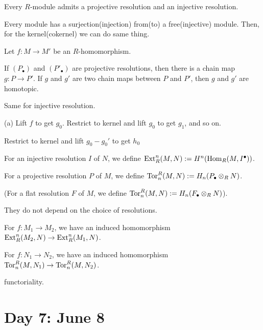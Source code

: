 \documentclass{../../../small}
\begin{document}
\begin{prop*}[2.4.2]
Every $R$-module admits a projective resolution and an injective resolution.
\end{prop*}
\begin{pf}
Every module has a surjection(injection) from(to) a free(injective) module.
Then, for the kernel(cokernel) we can do same thing.
\end{pf}
\begin{prop*}[2.4.3]
Let $f:M\to M'$ be an $R$-homomorphism.
\begin{parts}
\item If $(P_\bullet)$ and $(P'_\bullet)$ are projective resolutions, then there is a chain map $g:P\to P'$. If $g$ and $g'$ are two chain maps between $P$ and $P'$, then $g$ and $g'$ are homotopic.
\item Same for injective resolution.
\end{parts}
\end{prop*}
\begin{pf}
(a) Lift $f$ to get $g_0$. Restrict to kernel and lift $g_0$ to get $g_1$, and so on.

Restrict to kernel and lift $g_0-g_0'$ to get $h_0$
\end{pf}

For an injective resolution $I$ of $N$, we define $\operatorname{Ext}_R^n(M,N):=H^n(\operatorname{Hom}_R(M,I^\bullet))$.

For a projective resolution $P$ of $M$, we define $\operatorname{Tor}_n^R(M,N):=H_n(P_\bullet\otimes_RN)$.

(For a flat resolution $F$ of $M$, we define $\operatorname{Tor}_n^R(M,N):=H_n(F_\bullet\otimes_RN)$).

They do not depend on the choice of resolutions.

For $f:M_1\to M_2$, we have an induced homomorphism $\operatorname{Ext}_R^n(M_2,N)\to\operatorname{Ext}_R^n(M_1,N)$.

For $f:N_1\to N_2$, we have an induced homomorphism $\operatorname{Tor}_n^R(M,N_1)\to\operatorname{Tor}_n^R(M,N_2)$.

functoriality.


\newpage
\section{Day 7: June 8}
\end{document}
